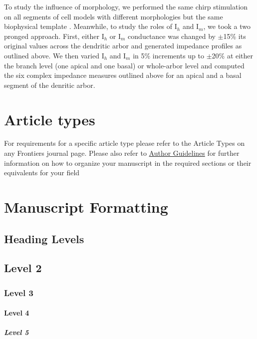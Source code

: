 \documentclass[utf8]{frontiersSCNS} %
\begin{document}
To study the influence of morphology, we performed the same chirp stimulation on all segments of cell models with
different morphologies but the same biophysical template \citep{Hay2011-if}.  Meanwhile, to study the roles of I$_h$ 
and I$_m$, we took a two pronged approach.  First, either I$_h$ or I$_m$ conductance was changed by $\pm$15\% its original
values across the dendritic arbor and generated impedance profiles as outlined above.  We then varied I$_h$ and I$_m$ in 5\%
increments up to $\pm$20\% at either the branch level (one apical and one basal) or whole-arbor level and computed the six complex
impedance measures outlined above for an apical and a basal segment of the denritic arbor.


\section{Article types}

For requirements for a specific article type please refer to the Article Types on any Frontiers journal page. Please also refer to  \href{http://home.frontiersin.org/about/author-guidelines#Sections}{Author Guidelines} for further information on how to organize your manuscript in the required sections or their equivalents for your field


\section{Manuscript Formatting}

\subsection{Heading Levels}


\subsection{Level 2}
\subsubsection{Level 3}
\paragraph{Level 4}
\subparagraph{Level 5}
\end{document}
